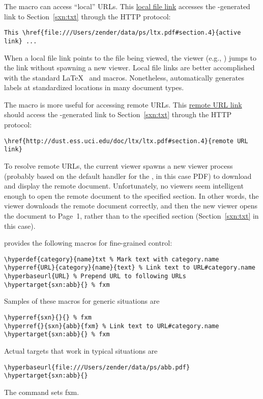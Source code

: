 \documentclass[12pt]{article}
\begin{document}
The \cmdidx{\href} macro can access ``local'' URLs.
This \href{file:///Users/zender/data/ps/ltx.pdf#section.4}{local file link}
accesses the -generated link to Section~\ref{sxn:txt}
through the HTTP  protocol:  
\begin{verbatim}
This \href{file:///Users/zender/data/ps/ltx.pdf#section.4}{active link} ...
\end{verbatim}
When a local file link points to the file being viewed, the viewer
(e.g., ) jumps to the link without spawning a new
viewer. 
Local file links are better accomplished with the standard \LaTeX\
\cmdltxidx{\label} and \cmdltxidx{\ref} macros.
Nonetheless,  automatically generates labels at
standardized locations in many document types.

The \cmdidx{\href} macro is more useful for accessing remote URLs.
This 
\href{http://dust.ess.uci.edu/doc/ltx/ltx.pdf#section.4}{remote URL link}
should access the \cmdprn{hyperref}-generated link to
Section~\ref{sxn:txt} through the HTTP  protocol: 
\begin{verbatim}
\href{http://dust.ess.uci.edu/doc/ltx/ltx.pdf#section.4}{remote URL link} 
\end{verbatim}
To resolve remote URLs, the current viewer spawns a new viewer process
(probably based on the default handler for the \trmidx{mime-type}, in
this case PDF) to download and display the remote document.
Unfortunately, no viewers seem intelligent enough to open the remote
document to the specified section.
In other words, the viewer downloads the remote document correctly,
and then the new viewer opens the document to Page~1, rather than to
the specified section (Section~\ref{sxn:txt} in this case).

 provides the following macros for fine-grained control:
\begin{verbatim}
\hyperdef{category}{name}txt % Mark text with category.name
\hyperref{URL}{category}{name}{text} % Link text to URL#category.name
\hyperbaseurl{URL} % Prepend URL to following URLs
\hypertarget{sxn:abb}{} % fxm
\end{verbatim}
Samples of these macros for generic situations are
\begin{verbatim}
\hyperref{sxn}{}{} % fxm
\hyperref{}{sxn}{abb}{fxm} % Link text to URL#category.name
\hypertarget{sxn:abb}{} % fxm
\end{verbatim}
Actual targets that work in typical situations are
\begin{verbatim}
\hyperbaseurl{file:///Users/zender/data/ps/abb.pdf}
\hypertarget{sxn:abb}{}
\end{verbatim}
The \cmdltxidx{\hypertarget} command sets fxm.
\end{document}
